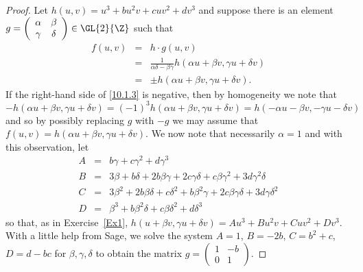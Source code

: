 \documentclass[10pt]{amsart}
\begin{document}
\begin{thm}
\begin{proof}
    Let $h(u,v) = u^3 + bu^2v + cuv^2 + dv^3$ and suppose there is an element $g = \left(\begin{array}{cc} \alpha & \beta\\ \gamma & \delta\end{array}\right) \in \GL{2}{\Z}$ such that 
      \begin{eqnarray}\label{10.1}
        f(u,v) &=& h \cdot g(u,v)\\
        &=& \frac{1}{\alpha\delta - \beta\gamma}h(\alpha u + \beta v, \gamma u + \delta v)\\ 
        &=& \pm h(\alpha u + \beta v, \gamma u + \delta v).\label{10.1.3}
      \end{eqnarray}
      If the right-hand side of \eqref{10.1.3} is negative, then by homogeneity we note that
      $$- h(\alpha u + \beta v, \gamma u + \delta v) = (-1)^3 h(\alpha u + \beta v, \gamma u + \delta v) = h(-\alpha u - \beta v, -\gamma u - \delta v)$$
      and so by possibly replacing $g$ with $-g$ we may assume that $f(u,v) = h(\alpha u + \beta v, \gamma u + \delta v)$.
      We now note that necessarily $\alpha = 1$ and with this observation, let 
      \begin{eqnarray*}
        A &=& b\gamma 
        + c \gamma^{2} 
        + d \gamma^{3}\\ 
        B &=& 3 \beta 
        + b \delta 
        + 2 b \beta \gamma 
        + 2 c \gamma \delta 
        + c \beta \gamma^{2} 
        + 3 d \gamma^{2} \delta\\
        C &=& 3 \beta^{2} 
        + 2 b \beta \delta 
        + c \delta^{2} 
        + b \beta^{2} \gamma 
        + 2 c \beta \gamma \delta
        + 3 d \gamma \delta^{2}\\
        D &=& \beta^{3} 
        + b \beta^{2} \delta 
        + c \beta \delta^{2} 
        + d \delta^{3}
      \end{eqnarray*}
      so that, as in Exercise~\ref{Ex1}, $h(u + \beta v, \gamma u + \delta v) = Au^3 + Bu^2v + Cuv^2 + Dv^3$.
      With a little help from Sage, we solve the system $A = 1$, $B = -2b$, $C = b^2 + c$, $D = d - bc$ for $\beta, \gamma, \delta$ to obtain the matrix $g = \left(\begin{array}{cc} 1 & -b\\ 0 & 1\end{array}\right)$.
  \end{proof}
\end{thm}
\end{document}
